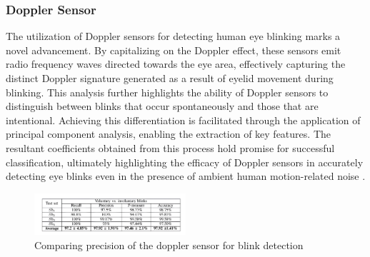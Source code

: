 \documentclass[conference]{IEEEtran}
\begin{document}
\subsubsection{Doppler Sensor}
The utilization of Doppler sensors for detecting human eye blinking marks a novel advancement. By capitalizing on the Doppler effect, these sensors emit radio frequency waves directed towards the eye area, effectively capturing the distinct Doppler signature generated as a result of eyelid movement during blinking. This analysis further highlights the ability of Doppler sensors to distinguish between blinks that occur spontaneously and those that are intentional. Achieving this differentiation is facilitated through the application of principal component analysis, enabling the extraction of key features. The resultant coefficients obtained from this process hold promise for successful classification, ultimately highlighting the efficacy of Doppler sensors in accurately detecting eye blinks even in the presence of ambient human motion-related noise \cite{Eye blink using Doppler sensor} \cite{doppler2}.
\begin{figure}[htbp]
\centerline{\includegraphics[width=0.5\textwidth]{doppler1.png}}
\caption{Comparing precision of the doppler sensor for blink detection \cite {IoT based blink detection}}
\label{fig1}
\end{figure}
\end{document}
